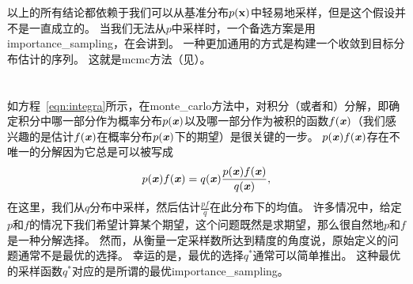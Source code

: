 以上的所有结论都依赖于我们可以从基准分布$p(\mathbf{x})$中轻易地采样，但是这个假设并不是一直成立的。
当我们无法从$p$中采样时，一个备选方案是用\gls{importance_sampling}，在会讲到。 %
一种更加通用的方式是构建一个收敛到目标分布估计的序列。 %
这就是\gls{mcmc}方法（见）。

\section{}
\label{sec:importance_sampling_chap17}

如方程~\eqref{eqn:integra}所示，在\gls{monte_carlo}方法中，对积分（或者和）分解，即确定积分中哪一部分作为概率分布$p(\boldsymbol{\mathit{x}})$以及哪一部分作为被积的函数$f(\boldsymbol{\mathit{x}})$（我们感兴趣的是估计$f(\boldsymbol{\mathit{x}})$在概率分布$p(\boldsymbol{\mathit{x}})$下的期望）是很关键的一步。   %
$p(\boldsymbol{\mathit{x}})f(\boldsymbol{\mathit{x}})$存在不唯一的分解因为它总是可以被写成    %
\begin{align}
\label{eqn:decomposition}
p(\boldsymbol{\mathit{x}})f(\boldsymbol{\mathit{x}}) = q(\boldsymbol{\mathit{x}}) \frac{p(\boldsymbol{\mathit{x}})f(\boldsymbol{\mathit{x}})}{q(\boldsymbol{\mathit{x}})},
\end{align}
在这里，我们从$q$分布中采样，然后估计$\frac{pf}{q}$在此分布下的均值。
许多情况中，给定$p$和$f$的情况下我们希望计算某个期望，这个问题既然是求期望，那么很自然地$p$和$f$是一种分解选择。  %
然而，从衡量一定采样数所达到精度的角度说，原始定义的问题通常不是最优的选择。   %
幸运的是，最优的选择$q^*$通常可以简单推出。    %
这种最优的采样函数$q^*$对应的是所谓的最优\gls{importance_sampling}。 %


